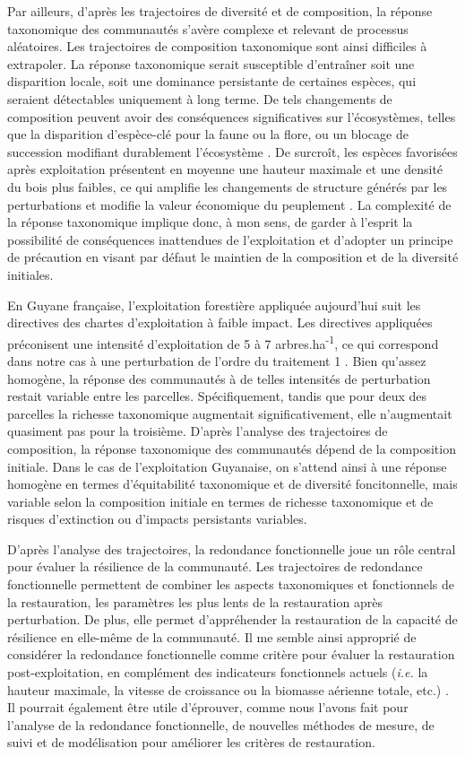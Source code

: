 \documentclass[
  11pt,
  french,
  A4paper,
  extrafontsizes,onecolumn,openright
  ]{memoir}
\begin{document}
Par ailleurs, d'après les trajectoires de diversité et de composition,
la réponse taxonomique des communautés s'avère complexe et relevant de
processus aléatoires. Les trajectoires de composition taxonomique sont
ainsi difficiles à extrapoler. La réponse taxonomique serait susceptible
d'entraîner soit une disparition locale, soit une dominance persistante
de certaines espèces, qui seraient détectables uniquement à long terme.
De tels changements de composition peuvent avoir des conséquences
significatives sur l'écosystèmes, telles que la disparition d'espèce-clé
pour la faune ou la flore, ou un blocage de succession modifiant
durablement l'écosystème \autocite{Diaz2005}. De surcroît, les espèces
favorisées après exploitation présentent en moyenne une hauteur maximale
et une densité du bois plus faibles, ce qui amplifie les changements de
structure générés par les perturbations et modifie la valeur économique
du peuplement \autocite{Reich2014}. La complexité de la réponse
taxonomique implique donc, à mon sens, de garder à l'esprit la
possibilité de conséquences inattendues de l'exploitation et d'adopter
un principe de précaution en visant par défaut le maintien de la
composition et de la diversité initiales.

En Guyane française, l'exploitation forestière appliquée aujourd'hui
suit les directives des chartes d'exploitation à faible impact. Les
directives appliquées préconisent une intensité d'exploitation de 5 à 7
arbres.ha\textsuperscript{-1}, ce qui correspond dans notre cas à une
perturbation de l'ordre du traitement 1 \autocite{Guitet2005}. Bien
qu'assez homogène, la réponse des communautés à de telles intensités de
perturbation restait variable entre les parcelles. Spécifiquement,
tandis que pour deux des parcelles la richesse taxonomique augmentait
significativement, elle n'augmentait quasiment pas pour la troisième.
D'après l'analyse des trajectoires de composition, la réponse
taxonomique des communautés dépend de la composition initiale. Dans le
cas de l'exploitation Guyanaise, on s'attend ainsi à une réponse
homogène en termes d'équitabilité taxonomique et de diversité
foncitonnelle, mais variable selon la composition initiale en termes de
richesse taxonomique et de risques d'extinction ou d'impacts persistants
variables.

D'après l'analyse des trajectoires, la redondance fonctionnelle joue un
rôle central pour évaluer la résilience de la communauté. Les
trajectoires de redondance fonctionnelle permettent de combiner les
aspects taxonomiques et fonctionnels de la restauration, les paramètres
les plus lents de la restauration après perturbation. De plus, elle
permet d'appréhender la restauration de la capacité de résilience en
elle-même de la communauté. Il me semble ainsi approprié de considérer
la redondance fonctionnelle comme critère pour évaluer la restauration
post-exploitation, en complément des indicateurs fonctionnels actuels
(\emph{i.e.} la hauteur maximale, la vitesse de croissance ou la
biomasse aérienne totale, etc.) \autocite{Sist2015}. Il pourrait
également être utile d'éprouver, comme nous l'avons fait pour l'analyse
de la redondance fonctionnelle, de nouvelles méthodes de mesure, de
suivi et de modélisation pour améliorer les critères de restauration.
\end{document}
